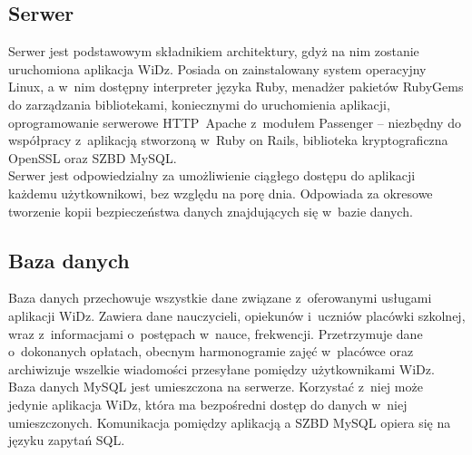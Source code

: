 \documentclass[12pt,leqno,twoside]{mwart}
\begin{document}
\subsection{Serwer}
\noindent Serwer jest podstawowym składnikiem architektury, gdyż na nim zostanie uruchomiona aplikacja WiDz. Posiada on zainstalowany system operacyjny Linux, a w~nim dostępny interpreter języka Ruby, menadżer pakietów RubyGems do zarządzania bibliotekami, koniecznymi do uruchomienia aplikacji, oprogramowanie serwerowe \hbox{HTTP Apache} z~modułem Passenger -- niezbędny do współpracy z~aplikacją stworzoną w~Ruby on Rails, biblioteka kryptograficzna OpenSSL oraz SZBD MySQL.\\
\indent Serwer jest odpowiedzialny za umożliwienie ciągłego dostępu do aplikacji każdemu użytkownikowi, bez względu na porę dnia. Odpowiada za okresowe tworzenie kopii bezpieczeństwa danych znajdujących się w~bazie danych. 

\subsection{Baza danych}
\noindent Baza danych przechowuje wszystkie dane związane z~oferowanymi usługami aplikacji WiDz. Zawiera dane nauczycieli, opiekunów i~uczniów placówki szkolnej, wraz z~informacjami o~postępach w~nauce, frekwencji. Przetrzymuje dane o~dokonanych opłatach, obecnym harmonogramie zajęć w~placówce oraz archiwizuje wszelkie wiadomości przesyłane pomiędzy użytkownikami WiDz.\\
\indent Baza danych  MySQL jest umieszczona na serwerze. Korzystać z~niej może jedynie aplikacja WiDz, która ma bezpośredni dostęp do danych w~niej umieszczonych. Komunikacja pomiędzy aplikacją a SZBD MySQL opiera się na języku zapytań SQL.
\end{document}
